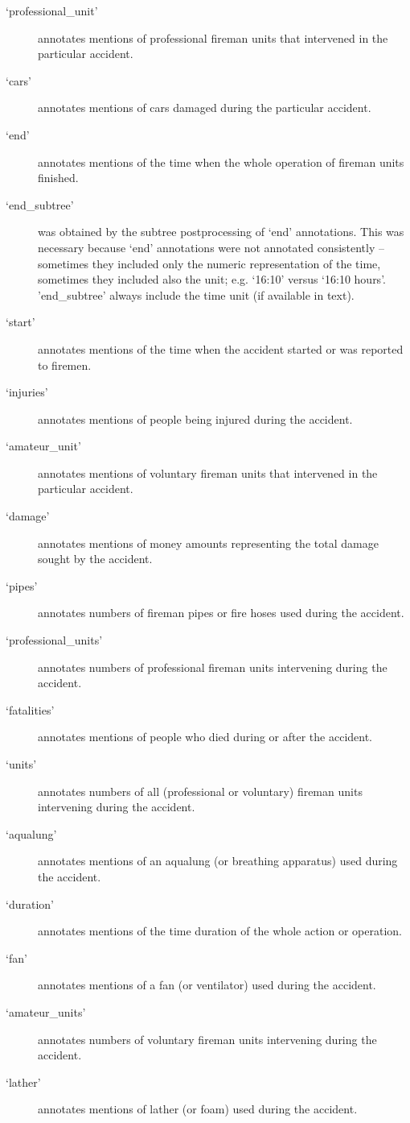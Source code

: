 \begin{description}
	\item[`professional\_unit'] annotates mentions of professional fireman units that intervened in the particular accident.
	\item[`cars'] annotates mentions of cars damaged during the particular accident.
	\item[`end'] annotates mentions of the time when the whole operation of fireman units finished.  
	\item[`end\_subtree'] was obtained by the subtree postprocessing of `end' annotations. This was necessary because `end' annotations were not annotated consistently -- sometimes they included only the numeric representation of the time, sometimes they included also the unit; e.g. `16:10' versus `16:10 hours'. 'end\_subtree' always include the time unit (if available in text).
	\item[`start'] annotates mentions of the time when the accident started or was reported to firemen.  
	\item[`injuries'] annotates mentions of people being injured during the accident. 
	\item[`amateur\_unit'] annotates mentions of voluntary fireman units that intervened in the particular accident.
	\item[`damage'] annotates mentions of money amounts representing the total damage sought by the accident.
	\item[`pipes'] annotates numbers of fireman pipes or fire hoses used during the accident.
	\item[`professional\_units'] annotates numbers of professional fireman units intervening during the accident.
	\item[`fatalities'] annotates mentions of people who died during or after the accident. 
	\item[`units'] annotates numbers of all (professional or voluntary) fireman units intervening during the accident.
	\item[`aqualung'] annotates mentions of an aqualung (or breathing apparatus) used during the accident.
	\item[`duration'] annotates mentions of the time duration of the whole action or operation.  
	\item[`fan'] annotates mentions of a fan (or ventilator) used during the accident.
	\item[`amateur\_units'] annotates numbers of voluntary fireman units intervening during the accident.
	\item[`lather'] annotates mentions of lather (or foam) used during the accident.
\end{description}



